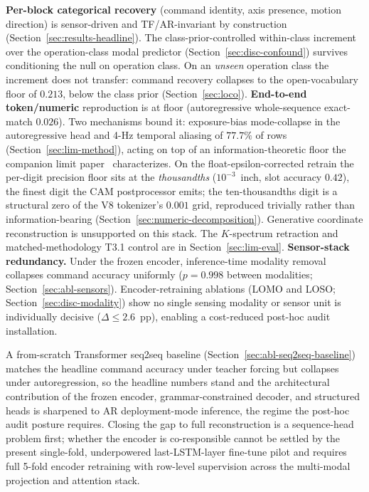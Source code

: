 \documentclass[sensors,article,submit,moreauthors,pdftex]{Definitions/mdpi}
\begin{document}
\begin{enumerate}[label=(\arabic*), leftmargin=*, itemsep=2pt]\let\item\olditem
\item \textbf{Per-block categorical recovery} (command identity, axis presence, motion direction) is sensor-driven and TF/AR-invariant by construction (Section~\ref{sec:results-headline}). The class-prior-controlled within-class increment over the operation-class modal predictor (Section~\ref{sec:disc-confound}) survives conditioning the null on operation class. On an \emph{unseen} operation class the increment does not transfer: command recovery collapses to the open-vocabulary floor of $0.213$, below the class prior (Section~\ref{sec:loco}).
\item \textbf{End-to-end token/numeric} reproduction is at floor (autoregressive whole-sequence exact-match $0.026$). Two mechanisms bound it: exposure-bias mode-collapse in the autoregressive head and 4-Hz temporal aliasing of $77.7\%$ of rows (Section~\ref{sec:lim-method}), acting on top of an information-theoretic floor the companion limit paper~\cite{paperB_entropy} characterizes. On the float-epsilon-corrected retrain the per-digit precision floor sits at the \emph{thousandths} ($10^{-3}$~inch, slot accuracy $0.42$), the finest digit the CAM postprocessor emits; the ten-thousandths digit is a structural zero of the V8 tokenizer's $0.001$ grid, reproduced trivially rather than information-bearing (Section~\ref{sec:numeric-decomposition}). Generative coordinate reconstruction is unsupported on this stack. The $K$-spectrum retraction and matched-methodology T3.1 control are in Section~\ref{sec:lim-eval}.
\item \textbf{Sensor-stack redundancy.} Under the frozen encoder, inference-time modality removal collapses command accuracy uniformly ($p\!=\!0.998$ between modalities; Section~\ref{sec:abl-sensors}). Encoder-retraining ablations (LOMO and LOSO; Section~\ref{sec:disc-modality}) show no single sensing modality or sensor unit is individually decisive ($\Delta\!\le\!2.6$~pp), enabling a cost-reduced post-hoc audit installation.
\end{enumerate}

A from-scratch Transformer seq2seq baseline (Section~\ref{sec:abl-seq2seq-baseline}) matches the headline command accuracy under teacher forcing but collapses under autoregression, so the headline numbers stand and the architectural contribution of the frozen encoder, grammar-constrained decoder, and structured heads is sharpened to AR deployment-mode inference, the regime the post-hoc audit posture requires. Closing the gap to full reconstruction is a sequence-head problem first; whether the encoder is co-responsible cannot be settled by the present single-fold, underpowered last-LSTM-layer fine-tune pilot and requires full 5-fold encoder retraining with row-level supervision across the multi-modal projection and attention stack.
\end{document}
